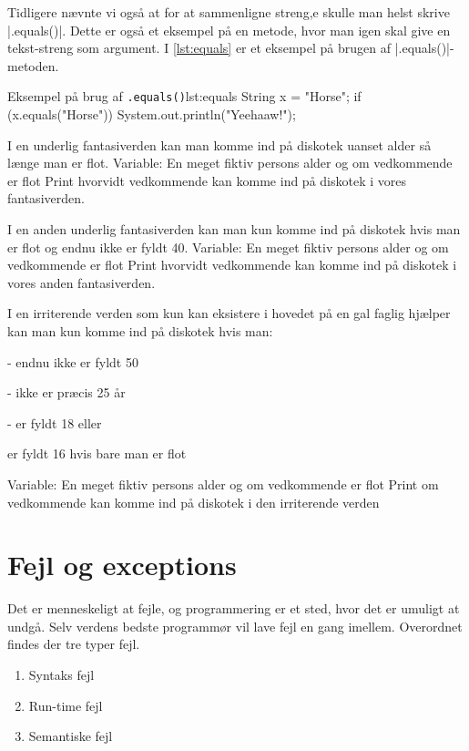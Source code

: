 {Tidligere nævnte vi også at for at sammenligne streng,e skulle man helst skrive \JavaInline|.equals()|. Dette er også et eksempel på en metode, hvor man igen skal give en tekst-streng som argument. I \autoref{lst:equals} er et eksempel på brugen af \JavaInline|.equals()|-metoden.

\begin{JavaCode}{Eksempel på brug af \texttt{.equals()}}{lst:equals}
	String x = "Horse";
	if (x.equals("Horse")) {
		System.out.println("Yeehaaw!");
	}
\end{JavaCode}

\begin{exercise}
	I en underlig fantasiverden kan man komme ind på diskotek uanset alder så længe man er flot.
	Variable: En meget fiktiv persons alder og om vedkommende er flot
	Print hvorvidt vedkommende kan komme ind på diskotek i vores fantasiverden.
\end{exercise}

\begin{exercise}
	I en anden underlig fantasiverden kan man kun komme ind på diskotek hvis man er flot og endnu ikke er fyldt 40.
	Variable: En meget fiktiv persons alder og om vedkommende er flot
	Print hvorvidt vedkommende kan komme ind på diskotek i vores anden fantasiverden.
\end{exercise}


\begin{exercise}
	I en irriterende verden som kun kan eksistere i hovedet på en gal faglig hjælper kan man kun komme ind på diskotek hvis man:
	
	- endnu ikke er fyldt 50
	
	- ikke er præcis 25 år
	
	- er fyldt 18
	eller
	
	er fyldt 16 hvis bare man er flot
	
	\noindent Variable: En meget fiktiv persons alder og om vedkommende er flot
	Print om vedkommende kan komme ind på diskotek i den irriterende verden
\end{exercise}

\section{Fejl og exceptions}
Det er menneskeligt at fejle, og programmering er et sted, hvor det er umuligt at undgå. Selv verdens bedste programmør vil lave fejl en gang imellem. Overordnet findes der tre typer fejl.

\begin{enumerate}
	\item Syntaks fejl
	\item Run-time fejl
	\item Semantiske fejl
\end{enumerate}

}
